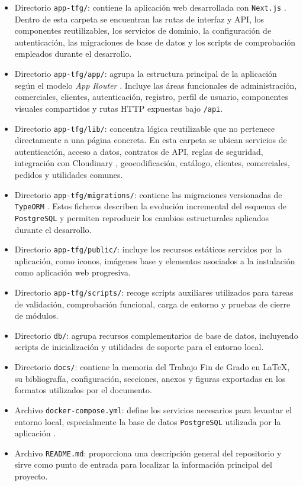\begin{itemize}
    \item Directorio \texttt{app-tfg/}: contiene la aplicación web desarrollada con \texttt{Next.js} \citep{nextjsdocs2026}. Dentro de esta carpeta se encuentran las rutas de interfaz y API, los componentes reutilizables, los servicios de dominio, la configuración de autenticación, las migraciones de base de datos y los scripts de comprobación empleados durante el desarrollo.
    \item Directorio \texttt{app-tfg/app/}: agrupa la estructura principal de la aplicación según el modelo \textit{App Router} \citep{nextjsdocs2026}. Incluye las áreas funcionales de administración, comerciales, clientes, autenticación, registro, perfil de usuario, componentes visuales compartidos y rutas HTTP expuestas bajo \texttt{/api}.
    \item Directorio \texttt{app-tfg/lib/}: concentra lógica reutilizable que no pertenece directamente a una página concreta. En esta carpeta se ubican servicios de autenticación, acceso a datos, contratos de API, reglas de seguridad, integración con Cloudinary \citep{cloudinaryupload2026}, geocodificación, catálogo, clientes, comerciales, pedidos y utilidades comunes.
    \item Directorio \texttt{app-tfg/migrations/}: contiene las migraciones versionadas de \texttt{TypeORM} \citep{typeormmigrations2026}. Estos ficheros describen la evolución incremental del esquema de \texttt{PostgreSQL} \citep{postgresdocs2026} y permiten reproducir los cambios estructurales aplicados durante el desarrollo.
    \item Directorio \texttt{app-tfg/public/}: incluye los recursos estáticos servidos por la aplicación, como iconos, imágenes base y elementos asociados a la instalación como aplicación web progresiva.
    \item Directorio \texttt{app-tfg/scripts/}: recoge scripts auxiliares utilizados para tareas de validación, comprobación funcional, carga de entorno y pruebas de cierre de módulos.
    \item Directorio \texttt{db/}: agrupa recursos complementarios de base de datos, incluyendo scripts de inicialización y utilidades de soporte para el entorno local.
    \item Directorio \texttt{docs/}: contiene la memoria del Trabajo Fin de Grado en \LaTeX{}, su bibliografía, configuración, secciones, anexos y figuras exportadas en los formatos utilizados por el documento.
    \item Archivo \texttt{docker-compose.yml}: define los servicios necesarios para levantar el entorno local, especialmente la base de datos \texttt{PostgreSQL} utilizada por la aplicación \citep{postgresdocs2026}.
    \item Archivo \texttt{README.md}: proporciona una descripción general del repositorio y sirve como punto de entrada para localizar la información principal del proyecto.
\end{itemize}

